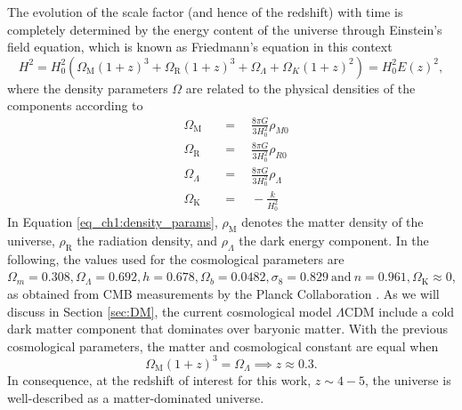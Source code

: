 The evolution of the scale factor (and hence of the redshift) with time is completely determined by the energy content of the universe through Einstein's field equation, which is known as Friedmann's equation in this context
\begin{equation}
    H^2=H_0^2\left( \Omega_\text{M} (1+z)^3+\Omega_\text{R} (1+z)^3 +\Omega_\Lambda + \Omega_K (1+z)^2 \right)=H_0^2E(z)^2,
\end{equation}
where the density parameters $\Omega$ are related to the physical densities of the components according to
\begin{equation}\label{eq_ch1:density_params}
    \begin{aligned}&\Omega_\text{M}&&=\quad\frac{8\pi G}{3H_0^2}\rho_{M0}\\&\Omega_\text{R}&&=\quad\frac{8\pi G}{3H_0^2}\rho_{R0}\\&\Omega_{\Lambda}&&=\quad\frac{8\pi G}{3H_0^2}\rho_{\Lambda}\\&\Omega_\text{K}&&=\quad-\frac k{H_0^2}\end{aligned}
\end{equation}
In Equation \ref{eq_ch1:density_params}, $\rho_\text{M}$ denotes the matter density of the universe, $\rho_\text{R}$ the radiation density, and $\rho_\Lambda$ the dark energy component. In the following, the values used for the cosmological parameters are $\Omega_m=0.308,\Omega_\Lambda=0.692,h=0.678,\Omega_b=0.0482,\sigma_8=0.829\mathrm{~and~}n=0.961, \Omega_\text{K}\approx 0$, as obtained from CMB measurements by the Planck Collaboration \cite{planck2014}. As we will discuss in Section \ref{sec:DM}, the current cosmological model $\Lambda$CDM include a cold dark matter component that dominates over baryonic matter. With the previous cosmological parameters, the matter and cosmological constant are equal when
\begin{equation}
    \Omega_\text{M}(1+z)^3=\Omega_\Lambda \implies z\approx 0.3.
\end{equation}
In consequence, at the redshift of interest for this work, $z\sim 4-5$, the universe is well-described as a matter-dominated universe.








